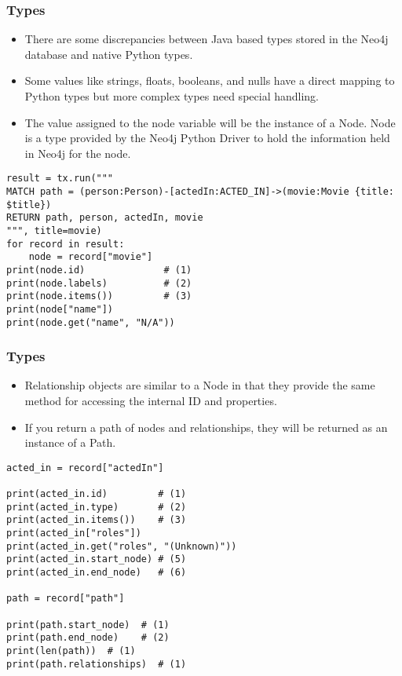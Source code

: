 \begin{frame}[fragile]\frametitle{Types}

\begin{itemize}
\item There are some discrepancies between Java based types stored in the Neo4j database and native Python types.
\item Some values like strings, floats, booleans, and nulls have a direct mapping to Python types but more complex types need special handling.
\item The value assigned to the node variable will be the instance of a Node. Node is a type provided by the Neo4j Python Driver to hold the information held in Neo4j for the node.
\end{itemize}

\begin{lstlisting}
result = tx.run("""
MATCH path = (person:Person)-[actedIn:ACTED_IN]->(movie:Movie {title: $title})
RETURN path, person, actedIn, movie
""", title=movie)
for record in result:
    node = record["movie"]
print(node.id)              # (1)
print(node.labels)          # (2)
print(node.items())         # (3)
print(node["name"])
print(node.get("name", "N/A"))		
\end{lstlisting}

\end{frame}

\begin{frame}[fragile]\frametitle{Types}

\begin{itemize}
\item Relationship objects are similar to a Node in that they provide the same method for accessing the internal ID and properties.
\item If you return a path of nodes and relationships, they will be returned as an instance of a Path.
\end{itemize}

\begin{lstlisting}
acted_in = record["actedIn"]

print(acted_in.id)         # (1)
print(acted_in.type)       # (2)
print(acted_in.items())    # (3)
print(acted_in["roles"])
print(acted_in.get("roles", "(Unknown)"))
print(acted_in.start_node) # (5)
print(acted_in.end_node)   # (6)

path = record["path"]

print(path.start_node)  # (1)
print(path.end_node)    # (2)
print(len(path))  # (1)
print(path.relationships)  # (1)
\end{lstlisting}

\end{frame}


